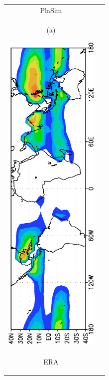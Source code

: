 \documentclass[12pt,a4paper,twoside,openright,headinclude,liststotoc,bibtotoc]{scrreprt}
\begin{document}
\begin{figure}[c]
\begin{tabular}{cc}
\hspace{-0.5cm}PlaSim
\\
\begin{minipage}{1.0\textwidth}
\begin{center}
\begin{scriptsize}(a)\end{scriptsize}\hspace{-1.28cm}\includegraphics[height=16.0cm,angle=-90]{eps/sgpanm.eps}
\end{center}
\end{minipage}
\\
\begin{minipage}{1.0\textwidth}\hspace{7.9cm}ERA\vspace{-0.5cm}
\begin{center}

\end{center}
\end{minipage}
\end{tabular}
\end{figure}
\end{document}
